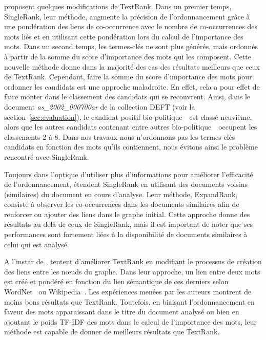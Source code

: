      proposent quelques modifications de TextRank.
    Dans un premier temps, SingleRank, leur méthode, augmente la précision de
    l'ordonnancement grâce à une pondération des liens de co-occurrence avec le
    nombre de co-occurrences des mots liés et en utilisant cette pondération
    lors du calcul de l'importance des mots.
    Dans un second temps, les termes-clés ne sont plus générés, mais ordonnés à
    partir de la somme du score d'importance des mots qui les composent. Cette
    nouvelle méthode donne dans la majorité des cas des résultats meilleurs que
    ceux de TextRank. Cependant, faire la somme du score d'importance des
    mots pour ordonner les candidats est une approche maladroite. En effet, cela
    a pour effet de faire monter dans le classement des candidats qui se
    recouvrent. Ainsi, dans le document \textit{as\_2002\_000700ar} de la
    collection DEFT (voir la section~\ref{sec:evaluation}), le candidat positif
    \og bio-politique~\fg\ est classé neuvième, alors que les autres candidats
    contenant entre autres \og bio-politique~\fg\ occupent les classements 2 à
    8. Dans nos travaux nous n'ordonnons pas les termes-clés candidats en
    fonction des mots qu'ils contiennent, nous évitons ainsi le problème
    rencontré avec SingleRank.

    Toujours dans l'optique d'utiliser plus d'informations pour améliorer
    l'efficacité de l'ordonnancement,  étendent
    SingleRank en utilisant des documents voisins (similaires) du document en
    cours d'analyse. Leur méthode, ExpandRank, consiste à observer les
    co-occurrences dans les documents similaires afin de renforcer ou ajouter
    des liens dans le graphe initial. Cette approche donne des résultats au delà
    de ceux de SingleRank, mais il est important de noter que ses performances
    sont fortement liées à la disponibilité de documents similaires à celui qui
    est analysé.

    A l'instar de ,
     tentent d'améliorer TextRank en
    modifiant le processus de création des liens entre les n\oe{}uds du graphe.
    Dans leur approche, un lien entre deux mots est créé et pondéré en fonction
    du lien sémantique de ces derniers selon WordNet~\cite{miller1995wordnet} ou
    Wikipedia~\cite{milne2008wikipediasemanticrelatedness}. Les expériences
    menées par les auteurs montrent de moins bons résultats que TextRank.
    Toutefois, en biaisant l'ordonnancement en faveur des mots apparaissant dans
    le titre du document analysé ou bien en ajoutant le poids TF-IDF des mots
    dans le calcul de l'importance des mots, leur méthode est capable de donner
    de meilleurs résultats que TextRank.

